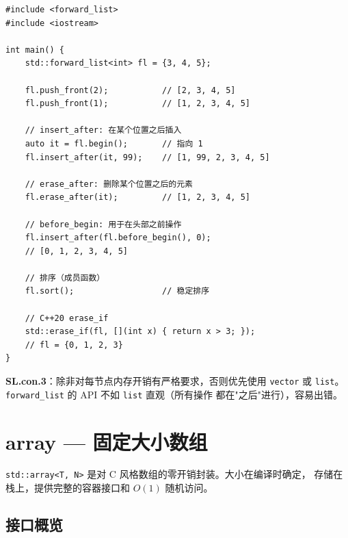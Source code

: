 \documentclass[12pt,a4paper,fontset=fandol]{ctexbook}
\newcommand{\Tp}[1]{\texttt{#1}}
\begin{document}
\begin{lstlisting}
#include <forward_list>
#include <iostream>

int main() {
    std::forward_list<int> fl = {3, 4, 5};

    fl.push_front(2);           // [2, 3, 4, 5]
    fl.push_front(1);           // [1, 2, 3, 4, 5]

    // insert_after: 在某个位置之后插入
    auto it = fl.begin();       // 指向 1
    fl.insert_after(it, 99);    // [1, 99, 2, 3, 4, 5]

    // erase_after: 删除某个位置之后的元素
    fl.erase_after(it);         // [1, 2, 3, 4, 5]

    // before_begin: 用于在头部之前操作
    fl.insert_after(fl.before_begin(), 0);
    // [0, 1, 2, 3, 4, 5]

    // 排序（成员函数）
    fl.sort();                  // 稳定排序

    // C++20 erase_if
    std::erase_if(fl, [](int x) { return x > 3; });
    // fl = {0, 1, 2, 3}
}
\end{lstlisting}

\begin{guideline}
\textbf{SL.con.3}：除非对每节点内存开销有严格要求，否则优先使用 \texttt{vector}
或 \texttt{list}。\texttt{forward\_list} 的 API 不如 \texttt{list} 直观（所有操作
都在"之后"进行），容易出错。
\end{guideline}

\chapter{array --- 固定大小数组}

\Tp{std::array<T, N>} 是对 C 风格数组的零开销封装。大小在编译时确定，
存储在栈上，提供完整的容器接口和 $O(1)$ 随机访问。

\section{接口概览}
\end{document}
